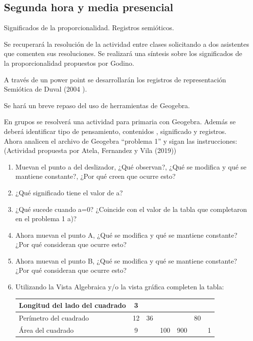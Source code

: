 \documentclass[oneside,spanish]{amsart}
\numberwithin{equation}{section}
\numberwithin{figure}{section}
\begin{document}
\subsection{Segunda hora y media presencial}

\begin{description}[itemsep=10pt]
    \item[Contenidos] Significados de la proporcionalidad. Registros semióticos. 

    Se recuperará la resolución de la actividad entre clases solicitando a dos asistentes  que comenten sus resoluciones. Se realizará una síntesis sobre los significados de la proporcionalidad propuestos por Godino.
    
    A través de un power point se desarrollarán  los registros de representación Semiótica  de Duval (2004 ). 
    
    Se hará un breve repaso del uso de herramientas de Geogebra.
    
    En grupos se resolverá  una actividad para primaria con Geogebra. Además se  deberá identificar tipo de pensamiento, contenidos , significado y registros.\\

    Ahora analicen el archivo de Geogebra “problema 1” y sigan las instrucciones:(Actividad propuesta por Atela, Fernandez y Vila (2019))\\

    \begin{enumerate}[label=\alph*), itemsep=10pt]
        \item Muevan el punto a del deslizador, ¿Qué observan?, ¿Qué se modifica y qué se mantiene constante?, ¿Por qué creen que ocurre esto?
        \item ¿Qué significado tiene el valor de a? 
        \item ¿Qué sucede cuando a=0? ¿Coincide con el valor de la tabla que completaron en el problema 1 a)?
        \item Ahora muevan el punto A, ¿Qué se modifica y qué se mantiene constante? ¿Por qué consideran que ocurre esto?
        \item Ahora muevan el punto B, ¿Qué se modifica y qué se mantiene constante? ¿Por qué consideran que ocurre esto?
        \item Utilizando la Vista Algebraica y/o la vista gráfica completen la tabla:

            \begin{table}[h]
                \centering
                \begin{tabular}{|l|c|c|c|c|c|c|}\hline
                    Longitud del lado del cuadrado & 3  &    &  &  &  &  \\\hline
                    Perímetro del cuadrado         & 12 & 36 &  &  & 80 & \\ \hline
                    Área del cuadrado              & 9  &    & 100 & 900 &  & 1 \\ \hline
                \end{tabular}
                \label{tab:tabla-longitud-perimetro-area}
            \end{table}
        

\end{enumerate}
\end{description}
\end{document}

